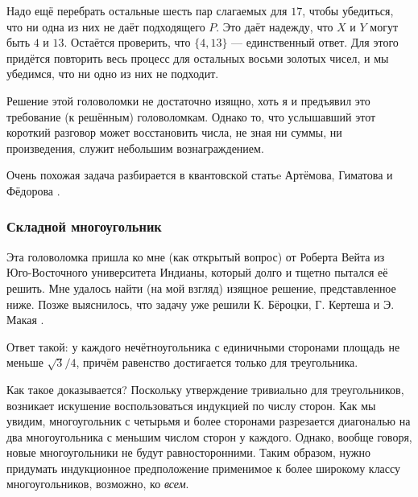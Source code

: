 Надо ещё перебрать остальные шесть пар слагаемых для $17$, чтобы убедиться, что ни одна из них не даёт подходящего $P$.
Это даёт надежду, что $X$ и $Y$ могут быть $4$ и $13$.
Остаётся проверить, что $\{4, 13\}$ --- единственный ответ.
Для этого придётся повторить весь процесс для остальных восьми золотых чисел, и мы убедимся, что ни одно из них не подходит.

Решение этой головоломки не достаточно изящно,
хоть я и предъявил это требование (к решённым) головоломкам.
Однако то, что услышавший этот короткий разговор может восстановить числа, не зная ни суммы, ни произведения, служит небольшим вознаграждением.

\begin{addedbytheeditors}
Очень похожая задача разбирается в квантовской статьe Артёмова, Гиматова и Фёдорова \cite{artemov-gimatov-fedorov}.\pr



\end{addedbytheeditors}

\subsubsection*{Складной многоугольник}

Эта головоломка пришла ко мне (как открытый вопрос) от Роберта Вейта из Юго-Восточного университета Индианы, который долго и тщетно пытался её решить.
Мне удалось найти (на мой взгляд) изящное решение, представленное ниже.
Позже выяснилось, что задачу уже решили К. Бёроцки, Г. Кертеша и Э. Макая \cite{9}.

Ответ такой: у каждого нечётноугольника с единичными сторонами площадь не меньше $\sqrt{3}/4$, причём равенство достигается только для треугольника.

Как такое доказывается?
Поскольку утверждение тривиально для треугольников, возникает искушение воспользоваться индукцией по числу сторон.
Как мы увидим,  многоугольник с четырьмя и более сторонами разрезается диагональю на два многоугольника с меньшим числом сторон у каждого.
Однако, вообще говоря, новые многоугольники не будут равносторонними.
Таким образом, нужно придумать индукционное предположение применимое к более широкому классу многоугольников, возможно, ко \emph{всем}.

